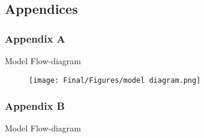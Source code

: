 \documentclass[12pt,letterpaper]{article}
\begin{document}
\begin{center}
    \subsection*{Appendices}
\end{center}
\begin{center}
    \subsubsection*{Appendix A}
    Model Flow-diagram
\end{center}

\begin{figure}[H]
    \centering
    \hspace{-0.5in}\texttt{[image: Final/Figures/model diagram.png]}
\end{figure}

\begin{center}
    \subsubsection*{Appendix B}
    Model Flow-diagram
\end{center}
\end{document}
